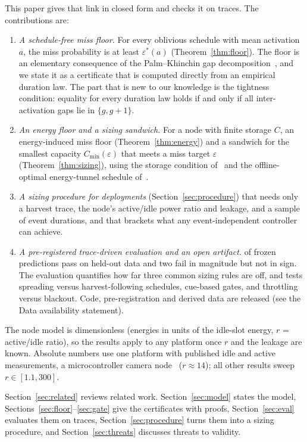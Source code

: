 \documentclass[final,5p,times,twocolumn]{elsarticle}
\theoremstyle{definition}
\theoremstyle{remark}
\newcommand{\eps}{\varepsilon}
\begin{document}
This paper gives that link in closed form and checks it on traces. The contributions are:
\begin{enumerate}
\item \emph{A schedule-free miss floor.} For every oblivious schedule with mean activation $a$, the miss probability is at least $\eps^*(a)$ (Theorem~\ref{thm:floor}). The floor is an elementary consequence of the Palm--Khinchin gap decomposition~\cite{daley2003pp1,lin2013opre,yau2010tosn}, and we state it as a certificate that is computed directly from an empirical duration law. The part that is new to our knowledge is the tightness condition: equality for every duration law holds if and only if all inter-activation gaps lie in $\{g,g+1\}$.
\item \emph{An energy floor and a sizing sandwich.} For a node with finite storage $C$, an energy-induced miss floor (Theorem~\ref{thm:energy}) and a sandwich for the smallest capacity $C_{\min}(\eps)$ that meets a miss target $\eps$ (Theorem~\ref{thm:sizing}), using the storage condition of~\cite{moser2007rts} and the offline-optimal energy-tunnel schedule of~\cite{tutuncuoglu2012twc}.
\item \emph{A sizing procedure for deployments} (Section~\ref{sec:procedure}) that needs only a harvest trace, the node's active/idle power ratio and leakage, and a sample of event durations, and that brackets what any event-independent controller can achieve.
\item \emph{A pre-registered trace-driven evaluation and an open artifact.} \nPass{} of \nPred{} frozen predictions pass on held-out data and two fail in magnitude but not in sign. The evaluation quantifies how far three common sizing rules are off, and tests spreading versus harvest-following schedules, cue-based gates, and throttling versus blackout. Code, pre-registration and derived data are released (see the Data availability statement).
\end{enumerate}
The node model is dimensionless (energies in units of the idle-slot energy, $r$ = active/idle ratio), so the results apply to any platform once $r$ and the leakage are known. Absolute numbers use one platform with published idle and active measurements, a microcontroller camera node~\cite{moosmann2025tinyissimo} ($r\approx14$); all other results sweep $r\in[1.1,300]$.

Section~\ref{sec:related} reviews related work. Section~\ref{sec:model} states the model, Sections~\ref{sec:floor}--\ref{sec:gate} give the certificates with proofs, Section~\ref{sec:eval} evaluates them on traces, Section~\ref{sec:procedure} turns them into a sizing procedure, and Section~\ref{sec:threats} discusses threats to validity.
\end{document}
